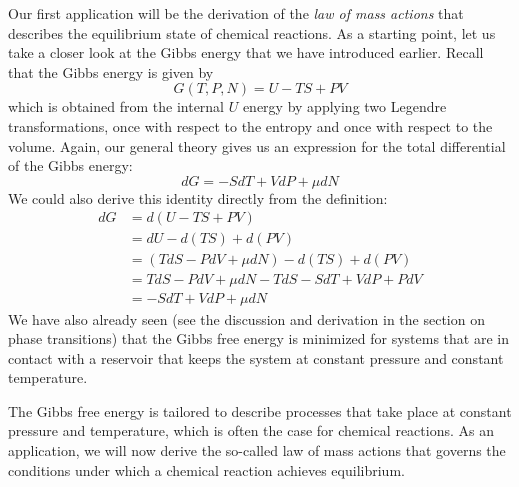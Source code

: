 \documentclass[a4paper, draft]{article}
\theoremstyle{own}
\theoremstyle{remark}
\begin{document}
Our first application will be the derivation of the {\em law of mass actions} that describes the equilibrium state of chemical reactions. As a starting point, let us take a closer look at the Gibbs energy that we have introduced earlier. Recall that the Gibbs energy is given by
$$
G(T, P, N) = U - TS + PV
$$
which is obtained from the internal $U$ energy by applying two Legendre transformations, once with respect to the entropy and once with respect to the volume. Again, our general theory gives us an expression for the total differential of the Gibbs energy:
$$
dG = - S dT + V dP + \mu dN
$$
We could also derive this identity directly from the definition:
\begin{align*}
dG &= d(U - TS + PV) \\
&= dU - d(TS) + d(PV) \\
&= (T dS - P dV  + \mu dN) - d(TS) + d(PV) \\
&= TdS - P dV + \mu dN - T dS - S dT + V dP + P dV \\
&=  - S dT + V dP + \mu dN  
\end{align*}
We have also already seen (see the discussion and derivation in the section on phase transitions) that the Gibbs free energy is minimized for systems that are in contact with a reservoir that keeps the system at constant pressure and constant temperature. 

The Gibbs free energy is tailored to describe processes that take place at constant pressure and temperature, which is often the case for chemical reactions. As an application, we will now derive the so-called law of mass actions that governs the conditions under which a chemical reaction achieves equilibrium.
\end{document}
